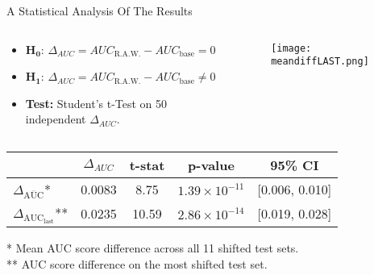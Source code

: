 \begin{frame}{A Statistical Analysis Of The Results}
    \begin{columns}[T]
        \begin{column}{0.59\textwidth}
            \vspace{1em}
            \begin{itemize}
                \item $\boldsymbol{H_0}$: $\Delta_{AUC} =  AUC_{\text{R.A.W.}} - AUC_{\text{base}} = 0$ \\        
                \item $\boldsymbol{H_1}$: $\Delta_{AUC} = AUC_{\text{R.A.W.}} - AUC_{\text{base}} \neq 0$ \\
                
                
                \item \textbf{Test:} Student's t-Test on 50 independent $\Delta_{AUC}$.
            \end{itemize}
            
            
            
            
        \end{column}
        
        \begin{column}{0.41\textwidth}
            \vspace{1em}
            \begin{figure}
                \centering
                \texttt{[image: meandiffLAST.png]}
            \end{figure}
        \end{column}
    \end{columns}

    \begin{table}
        \centering
        \small
        \begin{tabular}{lcccc}
            \toprule
            & $\Delta_{AUC}$ & t-stat & p-value & 95\% CI \\
            \midrule
            $\Delta_{\overline{\text{AUC}}}$* & 0.0083 & 8.75  & $1.39 \times 10^{-11}$ & [0.006, 0.010] \\
            $\Delta_{\text{AUC}_{\text{last}}}$** & 0.0235 & 10.59 & $2.86 \times 10^{-14}$ & [0.019, 0.028] \\
            \bottomrule
        \end{tabular}
    \end{table}
    
    \begin{footnotesize}
        * Mean AUC score difference across all 11 shifted test sets. \\
        ** AUC score difference on the most shifted test set.
    \end{footnotesize}
\end{frame}


    
